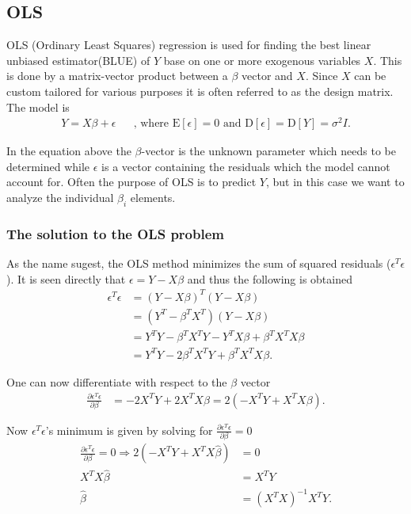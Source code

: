 \subsection{OLS}
OLS (Ordinary Least Squares) regression is used for finding the best linear unbiased estimator(BLUE) of $Y$ base on one or more exogenous variables $X$. 
This is done by a matrix-vector product between a $\beta$ vector and $X$.
Since $X$ can be custom tailored for various purposes it is often referred to as the design matrix. The model is
\begin{align}
Y=X \beta +\epsilon && \text{, where } \mathrm{E}[\epsilon] = 0 \text{ and } \mathrm{D}[\epsilon] = \mathrm{D}[Y] = \sigma^2 I .
\end{align}

In the equation above the $\beta$-vector is the unknown parameter which needs to be determined while  $\epsilon$ is a vector containing the residuals which the model cannot account for.
Often the purpose of OLS is to predict $Y$, but in this case we want to analyze the individual $\beta_i$ elements.

\subsubsection{The solution to the OLS problem}
As the name sugest, the OLS method minimizes the sum of squared residuals ($\epsilon^T \epsilon$).
It is seen directly that $\epsilon = Y - X \beta$ and thus the following is obtained
\begin{equation}
\begin{split}
\epsilon^T\epsilon&=(Y-X\beta)^T (Y-X\beta)\\
&=(Y^T-\beta^T X^T) (Y-X\beta) \\
&=Y^T Y-\beta^T X^T Y-Y^T X \beta + \beta^T X^T X \beta \\
&=Y^T Y- 2\beta^T X^T Y+ \beta^T X^T X \beta.
\end{split}
\end{equation}

One can now differentiate with respect to the $\beta$ vector
\begin{equation}
\begin{split}
\frac{\partial \epsilon^T\epsilon}{\partial \beta}&=-2 X^T Y+2X^T X \beta=2(-X^T Y+X^T X \beta).
\end{split}
\end{equation}

Now  $\epsilon^T \epsilon$'s minimum is given by solving for $\frac{\partial \epsilon^T\epsilon}{\partial \beta} = 0$
\begin{equation}
\begin{split}
\frac{\partial \epsilon^T\epsilon}{\partial \beta} = 0 \Rightarrow 2(-X^T Y+X^T X \hat{\beta}) &= 0 \\
X^T X \hat{\beta}&=X^T Y \\
\hat{\beta}&=(X^T X)^{-1} X^T Y.
\end{split}
\end{equation}

